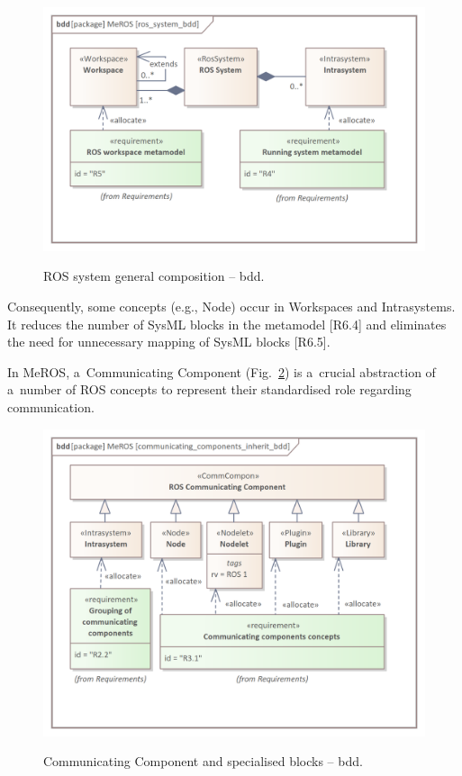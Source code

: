 \documentclass[11pt,oneside,a4paper]{article}
\begin{document}
	\begin{figure}[H]
		\centering
		\begin{center}
			{\includegraphics[scale=1.0]{img/meros_pkg/ros_system_bdd.png}}
		\end{center}
		\caption{ROS system general composition -- bdd.} 
		\label{fig:ros_system_bdd}
	\end{figure}
	
	Consequently, some concepts (e.g., Node) occur in Workspaces and Intrasystems. It reduces the number of SysML blocks in the metamodel [R6.4] and eliminates the need for unnecessary mapping of SysML blocks [R6.5].
		
	\pagebreak	
		
	In MeROS, a~Communicating Component (Fig.~\ref{fig:communicating_components_bdd}) is a~crucial abstraction of a~number of ROS concepts to represent their standardised role regarding communication. 
	
	\begin{figure}[H]
		\centering
		\begin{center}
			{\includegraphics[scale=1.0]{img/meros_pkg/communicating_components_inherit_bdd.png}}
		\end{center}
		\caption{Communicating Component and specialised blocks -- bdd.} 
		\label{fig:communicating_components_bdd}
	\end{figure}
	
\end{document}
